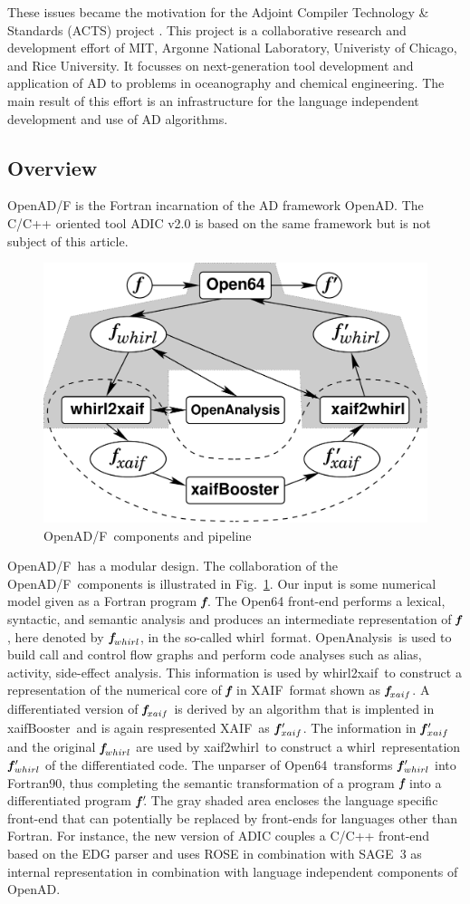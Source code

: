 \documentclass[11pt]{article}
\newcommand{\OpenADF}{OpenAD/F}
\newcommand{\OpenAD}{OpenAD}
\newcommand{\OpenAnalysis}{OpenAnalysis}
\newcommand{\OpenSixtyFour}{Open64}
\newcommand{\xaif}{XAIF}
\newcommand{\xaifBooster}{xaifBooster}
\newcommand{\whirl}{whirl}
\newcommand{\whirlToxaif}{whirl2xaif}
\newcommand{\xaifTowhirl}{xaif2whirl}
\newcommand{\bmf}{\mbox{\bf\em f}}
\newcommand{\bmfp}{\mbox{\bf\em f$\,^\prime\!\!$}}
\newcommand{\reffig}[1]{{Fig.~\ref{#1}}}
\begin{document}
These issues became the motivation for the 
Adjoint Compiler Technology \& Standards (ACTS) project \cite{actsWeb}.
This project is a collaborative
research and development effort of MIT, Argonne National Laboratory, 
Univeristy of Chicago, and Rice University. 
It focusses on  next-generation tool development and 
application of AD to problems in oceanography and chemical engineering.
The main result of this effort is an infrastructure for the language independent 
development and use of AD algorithms. 

\subsection{Overview}
\OpenADF \cite{openadWeb}
is the Fortran incarnation of the AD framework \OpenAD.
The C/C++ oriented tool ADIC v2.0 \cite{adicWeb}
is based on the same framework but is 
not subject of this article.
\begin{figure}
  \centering\includegraphics[width=.5\textwidth]{overview}
  \caption{\OpenADF\ components and pipeline} \label{fig:overview}
\end{figure}
\OpenADF\ has  a modular design. 
The collaboration  of the \OpenADF\ components is illustrated in 
\reffig{fig:overview}.
Our input is some numerical model given as a Fortran program 
$\bmf$.
The \OpenSixtyFour\cite{open64Web}
front-end performs a lexical, 
syntactic, and semantic analysis and produces an 
intermediate representation of $\bmf$, here denoted by $\bmf_{\whirl}$, 
in the so-called \whirl\ format.
\OpenAnalysis\ is used to build call and control flow graphs and  perform 
code analyses such as alias, activity, side-effect analysis.
This information is used by 
\whirlToxaif\ to construct a representation of the numerical core of $\bmf$ in
\xaif\ format shown as $\bmf_{xaif}$.  
A differentiated version of $\bmf_{xaif}$ is derived by an 
algorithm that is implented in \xaifBooster\ and is again respresented 
\xaif\ as $\bmfp_{xaif}$.
The information in $\bmfp_{xaif}$ and the original $\bmf_{\whirl}$ are used by 
\xaifTowhirl\ to construct a 
\whirl\ representation $\bmfp_{\whirl}$ of the differentiated code. 
The unparser of 
\OpenSixtyFour\ transforms $\bmfp_{\whirl}$ into Fortran90, thus completing
the semantic transformation of a program $\bmf$ into
a differentiated program $\bmfp$.
The gray shaded area encloses the language specific front-end that can potentially
be replaced by front-ends for languages other than Fortran. 
For instance, the new version of ADIC \cite{HoNo01} couples a C/C++ 
front-end 
based on the EDG parser \cite{edgWeb} and uses ROSE in combination with SAGE~3 \cite{roseWeb} 
as internal representation in combination with language independent components of \OpenAD.
\end{document}
